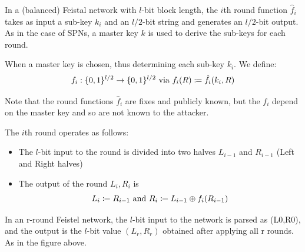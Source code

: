 \documentclass[12pt]{article}
\begin{document}
In a (balanced) Feistal network with $l$-bit block length, the $i$th round function $\hat{f}_i$ takes as input a sub-key $k_i$ and an $l/2$-bit string and generates an $l/2$-bit output. As in the case of SPNs, a master key $k$ is used to derive the sub-keys for each round.

When a master key is chosen, thus determining each sub-key $k_i$. We define:
\begin{equation*}
f_i: \{0, 1\}^{l/2} \rightarrow \{0, 1\}^{l/2} \text{ via } f_i(R) \coloneqq \hat{f}_i(k_i,R)
\end{equation*}

Note that the round functions $\hat{f}_i$ are fixes and publicly known, but the $f_i$ depend on the master key and so are not known to the attacker.

The $i$th round operates as follows:
\begin{itemize}
\item The $l$-bit input to the round is divided into two halves $L_{i-1}$ and $R_{i-1}$ (Left and Right halves)
\item The output of the round  $L_{i},R_{i}$ is
\begin{equation*}
L_i \coloneqq R_{i-1} \text{ and } R_i \coloneqq L_{i-1} \oplus f_i(R_{i-1})
\end{equation*}
\end{itemize}
In an r-round Feistel network, the $l$-bit input to the network is parsed as (L0,R0), and the output is the $l$-bit value $(L_r,R_r)$ obtained after applying all r rounds. As in the figure above.
\end{document}
